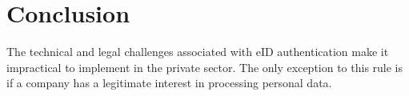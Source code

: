 \section{Conclusion}

The technical and legal challenges associated with eID authentication make it impractical to implement in the private sector. The only exception to this rule is if a company has a legitimate interest in processing personal data.